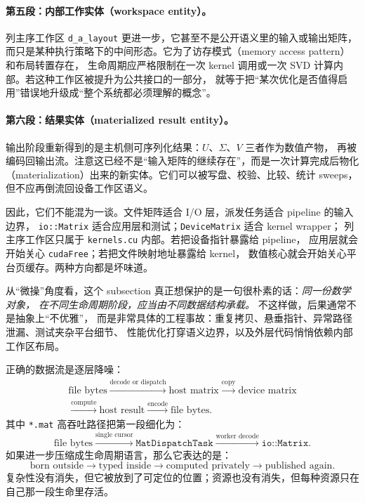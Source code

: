 \paragraph{第五段：内部工作实体（workspace entity）。}
列主序工作区 \texttt{d\_a\_layout} 更进一步，它甚至不是公开语义里的输入或输出矩阵，
而只是某种执行策略下的中间形态。它为了访存模式（memory access pattern）和布局转置存在，
生命周期应严格限制在一次 kernel 调用或一次 SVD 计算内部。若这种工作区被提升为公共接口的一部分，
就等于把“某次优化是否值得启用”错误地升级成“整个系统都必须理解的概念”。

\paragraph{第六段：结果实体（materialized result entity）。}
输出阶段重新得到的是主机侧可序列化结果：\(U\)、\(\Sigma\)、\(V\) 三者作为数值产物，
再被编码回输出流。注意这已经不是“输入矩阵的继续存在”，而是一次计算完成后物化
（materialization）出来的新实体。它们可以被写盘、校验、比较、统计 sweeps，
但不应再倒流回设备工作区语义。

因此，它们不能混为一谈。文件矩阵适合 I/O 层，派发任务适合 pipeline 的输入边界，
\texttt{io::Matrix} 适合应用层和测试；\texttt{DeviceMatrix} 适合 kernel wrapper；
列主序工作区只属于 \texttt{kernels.cu} 内部。若把设备指针暴露给 pipeline，
应用层就会开始关心 \texttt{cudaFree}；若把文件映射地址暴露给 kernel，
数值核心就会开始关心平台页缓存。两种方向都是坏味道。

从“微操”角度看，这个 subsection 真正想保护的是一句很朴素的话：\emph{同一份数学对象，
    在不同生命周期阶段，应当由不同数据结构承载。} 不这样做，后果通常不是抽象上“不优雅”，
而是非常具体的工程事故：重复拷贝、悬垂指针、异常路径泄漏、测试夹杂平台细节、
性能优化打穿语义边界，以及外层代码悄悄依赖内部工作区布局。

正确的数据流是逐层降噪：
\[
    \begin{gathered}
        \text{file bytes}
        \xrightarrow{\text{decode or dispatch}}
        \text{host matrix}
        \xrightarrow{\text{copy}}
        \text{device matrix} \\
        \xrightarrow{\text{compute}}
        \text{host result}
        \xrightarrow{\text{encode}}
        \text{file bytes}.
    \end{gathered}
\]
其中 \texttt{*.mat} 高吞吐路径把第一段细化为：
\[
    \text{file bytes}
    \xrightarrow{\text{single cursor}}
    \texttt{MatDispatchTask}
    \xrightarrow{\text{worker decode}}
    \texttt{io::Matrix}.
\]
如果进一步压缩成生命周期语言，那么它表达的是：
\[
    \text{born outside}
    \rightarrow
    \text{typed inside}
    \rightarrow
    \text{computed privately}
    \rightarrow
    \text{published again}.
\]
复杂性没有消失，但它被放到了可定位的位置；资源也没有消失，但每种资源只在自己那一段生命里存活。

